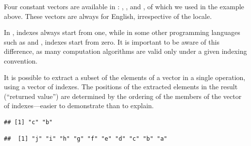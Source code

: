\documentclass[krantz2]{krantz}\usepackage{knitr}
\begin{document}
\begin{explainbox}
Four constant vectors are available in \Rlang: , ,  and  , of which we used  in the example above. These vectors are always for English, irrespective of the locale.
\end{explainbox}

\begin{warningbox}
In \Rlang, indexes always start from one, while in some other programming languages such as \Clang and \Cpplang, indexes start from zero. It is important to be aware of this difference, as many computation algorithms are valid only under a given indexing convention.
\end{warningbox}

It is possible to extract a subset of the elements of a vector in a single operation, using a vector of indexes. The positions of the extracted elements in the result (``returned value'') are determined by the ordering of the members of the vector of indexes---easier to demonstrate than to explain.

\begin{knitrout}\footnotesize
{}\color{fgcolor}\begin{kframe}
\begin{alltt}
\hlstd{a[}\hlstd{(}\hlstd{,}\hlstd{)]}
\end{alltt}
\begin{verbatim}
## [1] "c" "b"
\end{verbatim}
\begin{alltt}
\hlstd{a[}\hlopt{:}\hlstd{]}
\end{alltt}
\begin{verbatim}
##  [1] "j" "i" "h" "g" "f" "e" "d" "c" "b" "a"
\end{verbatim}
\end{kframe}
\end{knitrout}
\end{document}
